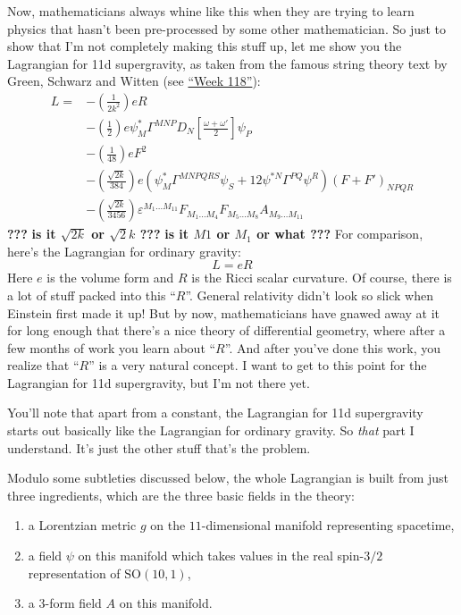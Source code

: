 \documentclass{article}
\begin{document}
Now, mathematicians always whine like this when they are trying to learn
physics that hasn't been pre-processed by some other mathematician. So
just to show that I'm not completely making this stuff up, let me show
you the Lagrangian for 11d supergravity, as taken from the famous string
theory text by Green, Schwarz and Witten (see
\protect\hyperlink{week118}{``Week 118''}): \[
  \begin{aligned}
    L =
    &- \left(\frac{1}{2k^2}\right) eR
  \\&- \left(\frac{1}{2}\right) e\psi_M^* \Gamma^{MNP} D_N\left[\frac{\omega+\omega'}{2}\right]\psi_P
  \\&- \left(\frac{1}{48}\right) eF^2
  \\&- \left(\frac{\sqrt{2k}}{384}\right) e(\psi_M^* \Gamma^{MNPQRS}\psi_S + 12\psi^{*N}\Gamma^{PQ}\psi^R)(F+F')_{NPQR}
  \\&- \left(\frac{\sqrt{2k}}{3456}\right) \varepsilon^{M_1\ldots M_{11}}F_{M_1\ldots M_4}F_{M_5\ldots M_8}A_{M_9\ldots M_{11}}
  \end{aligned}
\] \textbf{???} \textbf{is it \(\sqrt{2k}\) or \(\sqrt{2}k\) ???}
\textbf{is it \(M1\) or \(M_1\) or what ???} For comparison, here's the
Lagrangian for ordinary gravity: \[L = e R\] Here \(e\) is the volume
form and \(R\) is the Ricci scalar curvature. Of course, there is a lot
of stuff packed into this ``\(R\)''. General relativity didn't look so
slick when Einstein first made it up! But by now, mathematicians have
gnawed away at it for long enough that there's a nice theory of
differential geometry, where after a few months of work you learn about
``\(R\)''. And after you've done this work, you realize that ``\(R\)''
is a very natural concept. I want to get to this point for the
Lagrangian for 11d supergravity, but I'm not there yet.

You'll note that apart from a constant, the Lagrangian for 11d
supergravity starts out basically like the Lagrangian for ordinary
gravity. So \emph{that} part I understand. It's just the other stuff
that's the problem.

Modulo some subtleties discussed below, the whole Lagrangian is built
from just three ingredients, which are the three basic fields in the
theory:

\begin{enumerate}
\def\labelenumi{\Alph{enumi})}
\item
  a Lorentzian metric \(g\) on the \(11\)-dimensional manifold
  representing spacetime,
\item
  a field \(\psi\) on this manifold which takes values in the real
  spin-\(3/2\) representation of \(\mathrm{SO}(10,1)\),
\item
  a \(3\)-form field \(A\) on this manifold.
\end{enumerate}
\end{document}
